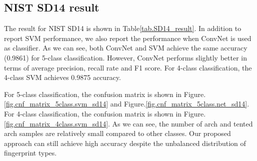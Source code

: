 \subsection{NIST SD14 result}
The result for NIST SD14 is shown in Table\ref{tab.SD14_result}. In addition to report SVM performance, we also report the performance when ConvNet is used as classifier. As we can see, both ConvNet and SVM achieve the same accuracy (0.9861) for 5-class classification. However, ConvNet performs slightly better  in terms of average precision, recall rate and F1 score.
%
For 4-class classification, the 4-class SVM achieves 0.9875 accuracy.

For 5-class classification, the confusion matrix is shown in Figure.\ref{fig.cnf_matrix_5class.svm_sd14} and Figure.\ref{fig.cnf_matrix_5class.net_sd14}.
For 4-class classification, the confusion matrix is shown in Figure.\ref{fig.cnf_matrix_4class.svm_sd14}. 
%
As we can see, the number of arch and tented arch samples are relatively small compared to other classes. Our proposed approach can still achieve high accuracy despite the unbalanced distribution of fingerprint types.


\begin{table}[!ht]
	
	\centering
	\caption{ Experiment results for NIST SD14. In column 4, 5 and 6, we also report the average precision, recall and F1 score for all predicted classes. }
	\label{tab.SD14_result}
\end{table}

